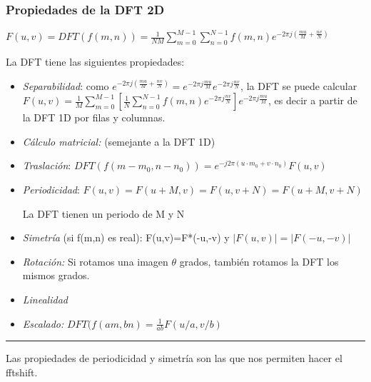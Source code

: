 \documentclass[handout]{beamer}
\numberwithin{section}{part}
\begin{document}

\begin{frame}
\frametitle{Propiedades de la DFT 2D}

\footnotesize

 \hspace{0.4cm} $F(u,v)=DFT(f(m,n))=\frac{1}{NM} \sum_{m=0}^{M-1} \sum_{n=0}^{N-1} f(m,n) e^{-2\pi j (\frac{mu}{M}+\frac{nv}{N})}$

 \vspace{0.2cm}

La DFT tiene las siguientes propiedades:

\begin{itemize}

\item \alert{\textit{Separabilidad}}: como $e^{-2\pi j (\frac{mu}{M}+\frac{nv}{N})}=e^{-2\pi j \frac{mu}{M}} e^{-2\pi j \frac{nv}{N}}$, la DFT se puede calcular $F(u,v)= \frac{1}{M} \sum_{m=0}^{M-1}\left[\frac{1}{N} \sum_{n=0}^{N-1} f(m,n) e^{-2\pi j \frac{nv}{N}} \right ] e^{-2\pi j \frac{mu}{M}}$, es decir a partir de la DFT 1D por filas y columnas.

\item  \alert{\textit{C\'{a}lculo matricial:}} (semejante a la DFT 1D)

\item  \alert{\textit{Traslaci\'{o}n}: }$ DFT(f(m-m_0,n-n_0))= e^{-j2 \pi (u \cdot m_0+v \cdot n_0)}F(u,v)$

\item \alert{\textit{Periodicidad}: } $F(u,v)=F(u+M,v)\!=\!F(u,v+N)\!=\!F(u+M,v+N)$

La DFT tienen un periodo de M y N

\item \alert{\textit{Simetr\'{i}a}} (si f(m,n) es real):  F(u,v)=F*(-u,-v) y  $|F(u,v)|=|F(-u,-v)|$

\item \alert{\textit{Rotaci\'{o}n:}} Si rotamos una imagen $\theta$ grados, tambi\'{e}n rotamos la DFT los mismos grados.

\item \alert{\textit{Linealidad}}

\item \alert{\textit{Escalado:}} $DFT(f(am,bn)=\frac{1}{ab}F(u/a,v/b)$


\end{itemize}


\hrule

\vspace{0.2cm}

\scriptsize
\color{gray} Las propiedades de periodicidad y simetr\'{i}a son las que nos permiten hacer el fftshift.

\end{frame}
\end{document}
